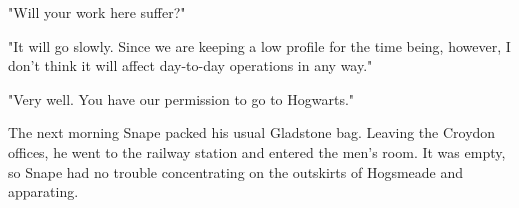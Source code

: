 "Will your work here suffer?"

"It will go slowly. Since we are keeping a low profile for the time being, however, I don't think it will affect day-to-day operations in any way."

"Very well. You have our permission to go to Hogwarts."

The next morning Snape packed his usual Gladstone bag. Leaving the Croydon offices, he went to the railway station and entered the men's room. It was empty, so Snape had no trouble concentrating on the outskirts of Hogsmeade and apparating. 


